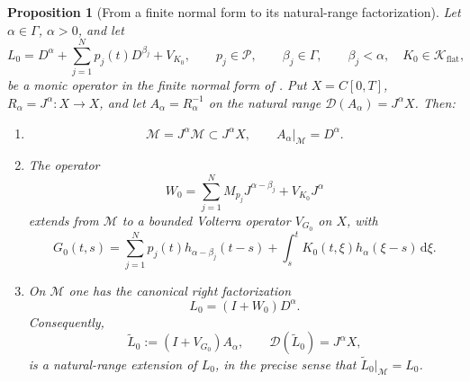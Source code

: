 \documentclass[11pt]{article}
\numberwithin{equation}{section}
\newtheorem{proposition}{Proposition}
\theoremstyle{definition}
\theoremstyle{remark}
\newcommand{\M}{\mathcal M}
\newcommand{\Pcal}{\mathcal P}
\newcommand{\Kflat}{\mathcal K_{\mathrm{flat}}}
\newcommand{\D}{\mathcal D}
\newcommand{\dd}{\,\mathrm d}
\begin{document}
\begin{proposition}[From a finite normal form to its natural-range factorization]
\label{prop:core-range-bridge}
Let $\alpha\in\Gamma$, $\alpha>0$, and let
\begin{equation}
L_0=D^\alpha+\sum_{j=1}^{N}p_j(t)D^{\beta_j}+V_{K_0},
\qquad
p_j\in\Pcal,\qquad \beta_j\in\Gamma,\qquad \beta_j<\alpha,
\quad K_0\in\Kflat,
\label{eq:monic-normal-form}
\end{equation}
be a monic operator in the finite normal form of .
Put $X=C[0,T]$, $R_\alpha=J^\alpha:X\to X$, and let
$A_\alpha=R_\alpha^{-1}$ on the natural range
$\D(A_\alpha)=J^\alpha X$.  Then:
\begin{enumerate}[label=\textup{(\roman*)},leftmargin=*]
\item
\begin{equation}
\M=J^\alpha\M\subset J^\alpha X,
\qquad
A_\alpha|_{\M}=D^\alpha.
\label{eq:core-range-compatibility}
\end{equation}
\item The operator
\begin{equation}
W_0=
\sum_{j=1}^{N}M_{p_j}J^{\alpha-\beta_j}
+V_{K_0}J^\alpha
\label{eq:algebraic-W0}
\end{equation}
extends from $\M$ to a bounded Volterra operator $V_{G_0}$ on $X$, with
\begin{equation}
G_0(t,s)=
\sum_{j=1}^{N}p_j(t)h_{\alpha-\beta_j}(t-s)
+\int_s^tK_0(t,\xi)h_\alpha(\xi-s)\dd\xi.
\label{eq:algebraic-reduced-kernel}
\end{equation}
\item On $\M$ one has the canonical right factorization
\begin{equation}
L_0=(I+W_0)D^\alpha.
\label{eq:algebraic-factorization}
\end{equation}
Consequently,
\begin{equation}
\widetilde L_0:=(I+V_{G_0})A_\alpha,
\qquad \D(\widetilde L_0)=J^\alpha X,
\label{eq:natural-range-extension}
\end{equation}
is a natural-range extension of $L_0$, in the precise sense that
$\widetilde L_0|_{\M}=L_0$.
\end{enumerate}
\end{proposition}
\end{document}
